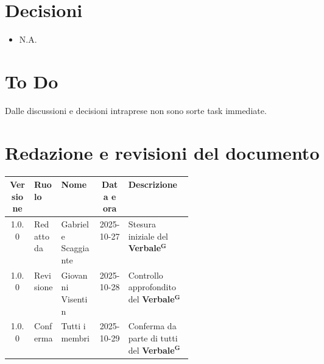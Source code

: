 \documentclass[a4paper,12pt]{article}
\newcommand{\term}[1]{\textbf{#1}$^\mathbf{G}$}
\begin{document}
\section{Decisioni}
\begin{itemize}
    \item N.A.
\end{itemize}

\section{To Do}
Dalle discussioni e decisioni intraprese non sono sorte task immediate.

\clearpage
\section{Redazione e revisioni del documento}

\begin{center}
\small
\renewcommand{\arraystretch}{1.2} 
\begin{tabular}{|c|l|l|c|>{\raggedright\arraybackslash}p{0.35\linewidth}|}
\hline
\rowcolor{gray!60} 
\textbf{Versione} & \textbf{Ruolo} & \textbf{Nome} & \textbf{Data e ora} & \textbf{Descrizione} \\
\hline
\rowcolor{white}
1.0.0 & Redatto da & Gabriele Scaggiante & 2025-10-27 & Stesura iniziale del \term{Verbale} \\
\hline
\rowcolor{gray!20}
1.0.0 & Revisione & Giovanni Visentin & 2025-10-28 & Controllo approfondito del \term{Verbale} \\
\hline
\rowcolor{white}
1.0.0 & Conferma & Tutti i membri & 2025-10-29 & Conferma da parte di tutti del \term{Verbale} \\
\hline

\end{tabular}
\end{center}


\end{document}

